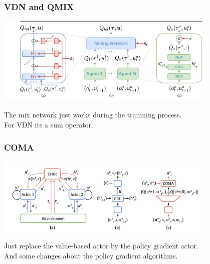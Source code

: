 \documentclass[notheorems, aspectratio=54]{beamer}
\begin{document}
\begin{frame}
  \frametitle{VDN and QMIX}
  \begin{center}
    \includegraphics[width=0.8\textwidth]{QMIX.png}
  \end{center}
    The mix network just works during the trainning process.\\
    For VDN its a sum operator. \\
\end{frame}

\begin{frame}
  \frametitle{COMA}
  \begin{center}
    \includegraphics[width=0.8\textwidth]{coma.png}
  \end{center}
  Just replace the value-based actor by the policy gradient actor. \\
  And some changes about the policy gradient algorithms.
\end{frame}
\end{document}
